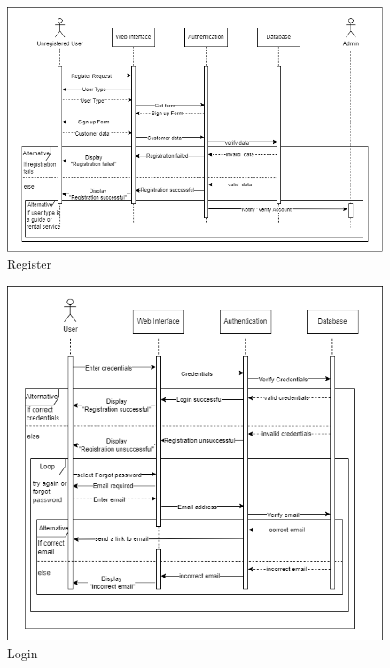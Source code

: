 \begin{figure}[h!]
    \centering
    \includegraphics[width=1\textwidth]{Images/Sequence Diagrams/Sequence diagrams-1-Register.drawio.png}
    \caption{Register}
\end{figure}

\begin{figure}[h!]
    \centering
    \includegraphics[width=1\textwidth]{Images/Sequence Diagrams/Sequence diagrams-2-Login.drawio.png}
    \caption{Login}
\end{figure}

